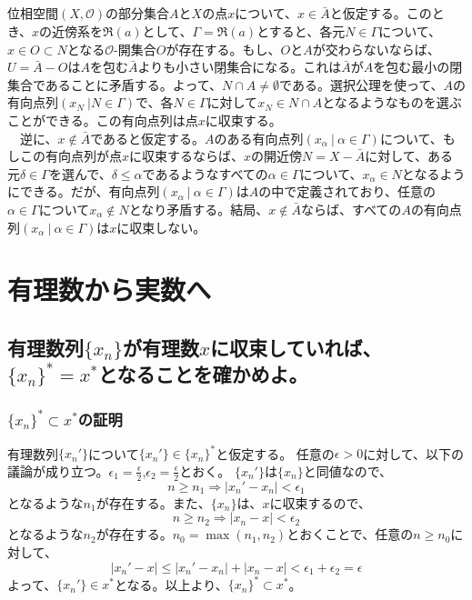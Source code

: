 \documentclass{jsarticle}
\begin{document}
\subsection{}
位相空間$(X,\mathcal{O})$の部分集合$A$と$X$の点$x$について、$x\in\bar{A}$と仮定する。このとき、$x$の近傍系を$\mathfrak{R}(a)$として、$\Gamma=\mathfrak{R}(a)$とすると、各元$N\in\Gamma$について、$x\in O\subset N$となる$\mathcal{O}$-開集合$O$が存在する。もし、$O$と$A$が交わらないならば、$U=\bar{A}-O$は$A$を包む$\bar{A}$よりも小さい閉集合になる。これは$\bar{A}$が$A$を包む最小の閉集合であることに矛盾する。よって、$N\cap A\neq\emptyset$である。選択公理を使って、$A$の有向点列$(x_N\ | N\in\Gamma)$で、各$N\in\Gamma$に対して$x_N\in N\cap A$となるようなものを選ぶことができる。この有向点列は点$x$に収束する。\\
　逆に、$x\notin \bar{A}$であると仮定する。$A$のある有向点列$(x_\alpha\ |\ \alpha\in\Gamma)$について、もしこの有向点列が点$x$に収束するならば、$x$の開近傍$N=X-\bar{A}$に対して、ある元$\delta\in\Gamma$を選んで、$\delta\leq\alpha$であるようなすべての$\alpha\in\Gamma$について、$x_\alpha\in N$となるようにできる。だが、有向点列$(x_\alpha\ |\ \alpha\in\Gamma)$は$A$の中で定義されており、任意の$\alpha\in\Gamma$について$x_\alpha\notin N$となり矛盾する。結局、$x\notin\bar{A}$ならば、すべての$A$の有向点列$(x_\alpha\ |\ \alpha\in\Gamma)$は$x$に収束しない。


















\newpage
\appendix
\section{有理数から実数へ}
\subsection{有理数列$\{x_n\}$が有理数$x$に収束していれば、$\{x_n\}^*=x^*$となることを確かめよ。}
\subsubsection{$\{x_n\}^*\subset x^*$の証明}
有理数列$\{x_n'\}$について$\{x_n'\}\in\{x_n\}^*$と仮定する。
任意の$\epsilon>0$に対して、以下の議論が成り立つ。$\epsilon_1=\frac{\epsilon}{2}$,$\epsilon_2=\frac{\epsilon}{2}$とおく。
$\{x_n'\}$は$\{x_n\}$と同値なので、
\[n\geq n_1 \Longrightarrow|x_n'-x_n|<\epsilon_1\]
となるような$n_1$が存在する。また、$\{x_n\}$は、$x$に収束するので、
\[n\geq n_2 \Longrightarrow|x_n-x|<\epsilon_2\]
となるような$n_2$が存在する。$n_0=\max(n_1,n_2)$とおくことで、任意の$n\geq n_0$に対して、
\[|x_n'-x|\leq |x_n'-x_n|+|x_n-x| < \epsilon_1+\epsilon_2 =\epsilon\]
よって、$\{x_n'\}\in x^*$となる。以上より、$\{x_n\}^*\subset x^*$。
\end{document}
